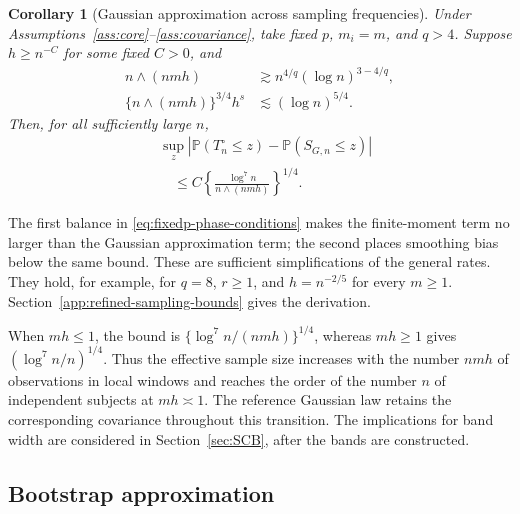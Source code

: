 \documentclass[12pt]{article}
\newtheorem{corollary}{Corollary}
\newcommand{\prob}{\mathbb{P}}
\numberwithin{equation}{section}
\begin{document}
\begin{corollary}[Gaussian approximation across sampling frequencies]
\label{cor:fixedp-phase}
Under Assumptions~\ref{ass:core}--\ref{ass:covariance}, take fixed $p$,
$m_i=m$, and $q>4$. Suppose $h\ge n^{-C}$ for some fixed $C>0$, and
\begin{equation}
\begin{aligned}
n\wedge(nmh)&\gtrsim n^{4/q}(\log n)^{3-4/q},\\
\{n\wedge(nmh)\}^{3/4}h^s&\lesssim(\log n)^{5/4}.
\end{aligned}
\label{eq:fixedp-phase-conditions}
\end{equation}
Then, for all sufficiently large $n$,
\begin{equation}
\begin{aligned}
&\sup_z\left|\prob(T_n^\circ\le z)-\prob(S_{G,n}\le z)\right|\\
&\quad\le C\left\{\frac{\log^7 n}{n\wedge(nmh)}\right\}^{1/4}.
\end{aligned}
\label{eq:fixedp-phase-clt}
\end{equation}
\end{corollary}

The first balance in \eqref{eq:fixedp-phase-conditions} makes the
finite-moment term no larger than the Gaussian approximation term;
the second places smoothing bias below the same bound. These are
sufficient simplifications of the general rates. They hold, for
example, for $q=8$, $r\ge1$, and $h=n^{-2/5}$ for every $m\ge1$.
Section~\ref{app:refined-sampling-bounds} gives the derivation.

When $mh\le1$, the bound is
$\{\log^7 n/(nmh)\}^{1/4}$, whereas $mh\ge1$ gives
$(\log^7 n/n)^{1/4}$. Thus the effective sample size increases with
the number $nmh$ of observations in local windows and reaches the
order of the number $n$ of independent subjects at $mh\asymp1$.
The reference Gaussian law retains the corresponding covariance
throughout this transition. The implications for band width are
considered in Section~\ref{sec:SCB}, after the bands are constructed.

\subsection{Bootstrap approximation}\label{sec:theory-bootstrap}
\end{document}
